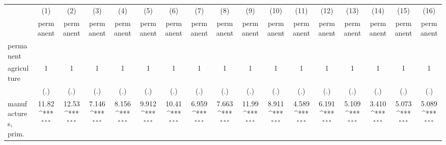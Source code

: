 {
\def\sym#1{\ifmmode^{#1}\else\(^{#1}\)\fi}
\begin{tabular}{l*{16}{c}}
\hline\hline
                    &\multicolumn{1}{c}{(1)}&\multicolumn{1}{c}{(2)}&\multicolumn{1}{c}{(3)}&\multicolumn{1}{c}{(4)}&\multicolumn{1}{c}{(5)}&\multicolumn{1}{c}{(6)}&\multicolumn{1}{c}{(7)}&\multicolumn{1}{c}{(8)}&\multicolumn{1}{c}{(9)}&\multicolumn{1}{c}{(10)}&\multicolumn{1}{c}{(11)}&\multicolumn{1}{c}{(12)}&\multicolumn{1}{c}{(13)}&\multicolumn{1}{c}{(14)}&\multicolumn{1}{c}{(15)}&\multicolumn{1}{c}{(16)}\\
                    &\multicolumn{1}{c}{permanent}&\multicolumn{1}{c}{permanent}&\multicolumn{1}{c}{permanent}&\multicolumn{1}{c}{permanent}&\multicolumn{1}{c}{permanent}&\multicolumn{1}{c}{permanent}&\multicolumn{1}{c}{permanent}&\multicolumn{1}{c}{permanent}&\multicolumn{1}{c}{permanent}&\multicolumn{1}{c}{permanent}&\multicolumn{1}{c}{permanent}&\multicolumn{1}{c}{permanent}&\multicolumn{1}{c}{permanent}&\multicolumn{1}{c}{permanent}&\multicolumn{1}{c}{permanent}&\multicolumn{1}{c}{permanent}\\
\hline
permanent           &                     &                     &                     &                     &                     &                     &                     &                     &                     &                     &                     &                     &                     &                     &                     &                     \\
agriculture         &           1         &           1         &           1         &           1         &           1         &           1         &           1         &           1         &           1         &           1         &           1         &           1         &           1         &           1         &           1         &           1         \\
                    &         (.)         &         (.)         &         (.)         &         (.)         &         (.)         &         (.)         &         (.)         &         (.)         &         (.)         &         (.)         &         (.)         &         (.)         &         (.)         &         (.)         &         (.)         &         (.)         \\
[1em]
manufactures, prim. &       11.82\sym{***}&       12.53\sym{***}&       7.146\sym{***}&       8.156\sym{***}&       9.912\sym{***}&       10.41\sym{***}&       6.959\sym{***}&       7.663\sym{***}&       11.99\sym{***}&       8.911\sym{***}&       4.589\sym{***}&       6.191\sym{***}&       5.109\sym{***}&       3.410\sym{***}&       5.073\sym{***}&       5.089\sym{***}\\

\end{tabular}}
